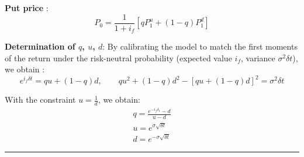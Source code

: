 \begin{f}
\textbf{Put price} :
\[
P_{0} = \frac{1}{1+i_f} \left[ q P_{1}^{u} + (1 - q) P_{1}^{d} \right]
\]

\textbf{Determination of $q$, $u$, $d$}:  
By calibrating the model to match the first moments of the return under the risk-neutral probability (expected value $i_f$, variance $\sigma^2 \delta t$), we obtain :
\[
e^{i_{f} \delta t} = q u + (1-q) d, \qquad q u^2 + (1-q) d^2 - [q u + (1-q) d]^2 = \sigma^2 \delta t
\]

With the constraint $u = \frac{1}{d}$, we obtain:
\[
\begin{array}{l}
	q = \frac{e^{-i_f \delta_t} - d}{u - d} \\
	u = e^{\sigma \sqrt{\delta t}} \\
	d = e^{-\sigma \sqrt{\delta t}}
\end{array}
\]

\end{f}
\hrule

